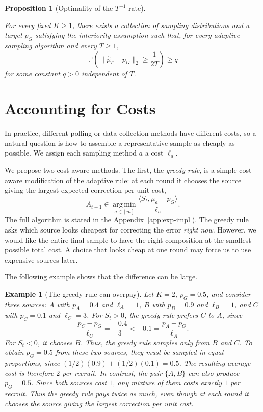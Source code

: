 \documentclass[twoside]{article}
\newtheorem{example}{Example}
\newtheorem{proposition}{Proposition}
\begin{document}
\begin{proposition}[Optimality of the \(T^{-1}\) rate]
\label{prop:multidimensional-guarantee}

For every fixed \(K\geq 1\), there exists a collection of sampling
distributions and a target \(p_G\) satisfying the interiority assumption
such that, for every adaptive sampling algorithm and every \(T\geq 1\),
\[
\mathbb P\left(
\|\widehat p_T-p_G\|_2
\geq \frac{1}{2T}
\right)
\geq q
\]
for some constant \(q>0\) independent of \(T\).
\end{proposition}

\section{Accounting for Costs}
\label{sec:cost}
In practice, different polling or data-collection methods have different
costs, so a natural question is how to assemble a representative sample as
cheaply as possible. We assign each sampling method \(a\) a cost \(\ell_a\).

We propose two cost-aware methods. The first, the \emph{greedy rule}, is a
simple cost-aware modification of the adaptive rule: at each round it chooses
the source giving the largest expected correction per unit cost,
\[
A_{t+1}
\in
\operatorname*{arg\,min}_{a\in[m]}
\frac{\langle S_t,\mu_a-p_G\rangle}{\ell_a}.
\]
The full algorithm is stated in the Appendix~\ref{app:exp-impl}). The greedy rule asks which source looks cheapest for correcting the error
\emph{right now}. However, we would like the entire final sample to have the right
composition at the smallest possible total cost. A choice that looks cheap
at one round may force us to use expensive sources later. 

The following example shows that the difference can
be large.

\begin{example}[The greedy rule can overpay]
\label{ex:greedy}
Let \(K=2\), \(p_G=0.5\), and consider three sources:
\(A\) with \(p_A=0.4\) and \(\ell_A=1\),
\(B\) with \(p_B=0.9\) and \(\ell_B=1\), and
\(C\) with \(p_C=0.1\) and \(\ell_C=3\). 
For \(S_t>0\), the greedy rule prefers \(C\) to \(A\), since
\[
\frac{p_C-p_G}{\ell_C}
=
\frac{-0.4}{3}
<
-0.1
=
\frac{p_A-p_G}{\ell_A}.
\]
For \(S_t<0\), it chooses \(B\). Thus, the greedy rule samples only
from \(B\) and \(C\). 
To obtain \(p_G=0.5\) from these two sources, they must be sampled in
equal proportions, since $(1/2)(0.9)+ (1/2)(0.1)=0.5$. The resulting average cost is therefore $2$ per recruit. In contrast, the pair \(\{A,B\}\) can also produce \(p_G=0.5\).
Since both sources cost \(1\), any mixture of them costs exactly \(1\)
per recruit. Thus the greedy rule pays twice as much, even though at
each round it chooses the source giving the largest correction per unit
cost.
\end{example}
\end{document}
